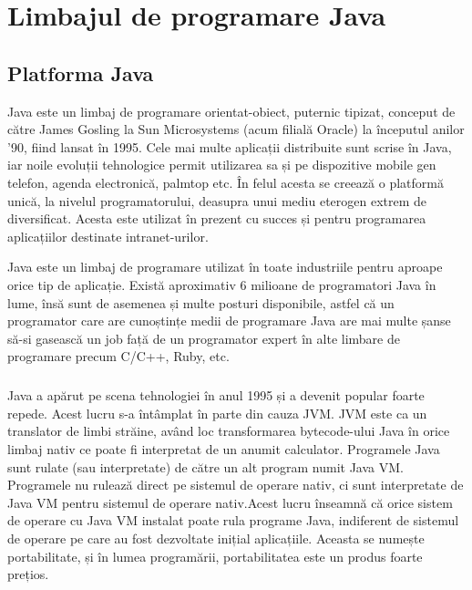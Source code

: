 \chapter{Limbajul de programare Java}

\section{Platforma Java}
\vspace{1cm}
\begin{defn}
Java este un limbaj de programare orientat-obiect, puternic tipizat, conceput de către James Gosling la Sun Microsystems (acum filială Oracle) la începutul anilor '90, fiind lansat în 1995. Cele mai multe aplicații distribuite sunt scrise în Java, iar noile evoluții tehnologice permit utilizarea sa și pe dispozitive mobile gen telefon, agenda electronică, palmtop etc. În felul acesta se creează o platformă unică, la nivelul programatorului, deasupra unui mediu eterogen extrem de diversificat. Acesta este utilizat în prezent cu succes și pentru programarea aplicațiilor destinate intranet-urilor. \cite{12}
\end{defn}
Java este un limbaj de programare utilizat în toate industriile pentru aproape orice tip de aplicație. Există aproximativ 6 milioane de programatori Java în lume, însă sunt de asemenea și multe posturi disponibile, astfel că un programator care are cunoștințe medii de programare Java are mai multe șanse să-si gasească un job față de un programator expert în alte limbare de programare precum C/C++, Ruby, etc.
\paragraph{ }Java a apărut pe scena tehnologiei în anul 1995 și a devenit popular foarte repede. Acest lucru s-a întâmplat în parte din cauza JVM.
JVM este ca un translator de limbi străine, având loc transformarea bytecode-ului Java în orice limbaj nativ ce poate fi interpretat de un anumit calculator.\cite{10}\newline
Programele Java sunt rulate (sau interpretate) de către un alt program numit Java VM. Programele nu rulează direct pe sistemul de operare nativ, ci sunt interpretate de Java VM pentru sistemul de operare nativ.\newpage Acest lucru înseamnă că orice sistem de operare cu Java VM instalat poate rula programe Java, indiferent de sistemul de operare pe care au fost dezvoltate inițial aplicațiile.\newline
 Aceasta se numește portabilitate, și în lumea programării, portabilitatea este un produs foarte prețios.\cite{11} \newline

